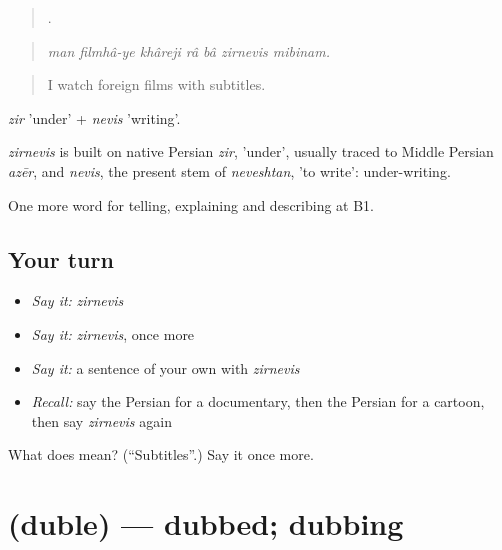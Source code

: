 \begin{quote}
      .
\end{quote}

\begin{quote}
\emph{man filmhâ-ye khâreji râ bâ zirnevis mibinam.}
\end{quote}

\begin{quote}
I watch foreign films with subtitles.
\end{quote}

\emph{zir} 'under' + \emph{nevis} 'writing'.

\begin{cousinweb}
\emph{zirnevis} is built on native Persian \emph{zir}, 'under', usually traced to Middle Persian \emph{azēr}, and \emph{nevis}, the present stem of \emph{neveshtan}, 'to write': under-writing.
\end{cousinweb}

\begin{grammarlens}[title={What you've built}]
One more word for telling, explaining and describing at B1.
\end{grammarlens}

\subsection*{Your turn}
\begin{itemize}
\raggedright
  \item \emph{Say it:} \emph{zirnevis}
  \item \emph{Say it:} \emph{zirnevis}, once more
  \item \emph{Say it:} a sentence of your own with \emph{zirnevis}
  \item \emph{Recall:} say the Persian for a documentary, then the Persian for a cartoon, then say \emph{zirnevis} again
\end{itemize}

\begin{tcolorbox}[breakable,colback=teal!4,colframe=teal!35!black,title={Before you move on}]
What does  mean? (\textquotedblleft{}Subtitles\textquotedblright{}.) Say it once more.
\end{tcolorbox}
\section[\texorpdfstring{\fa{دوبله} (duble)}{دوبله (duble)}]{ (duble) — dubbed; dubbing}

